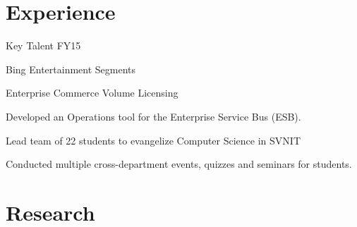 \documentclass[]{single-page-resume}
\begin{document}
\hfill
\begin{minipage}[t]{0.66\textwidth} 


\section{Experience}

\vspace{\topsep} %
\begin{tightemize}
    \item Key Talent FY15
    \item Bing Entertainment Segments
    \item Enterprise Commerce Volume Licensing
\end{tightemize}
\sectionsep

\begin{tightemize}
    \item Developed an Operations tool for the Enterprise Service Bus (ESB). \end{tightemize}
\sectionsep

\begin{tightemize}
    \item Lead team of 22 students to evangelize Computer Science in SVNIT
    \item Conducted multiple cross-department events, quizzes and seminars for students.  \end{tightemize}
\sectionsep

\sectionsep



\section{Research}
\descript{}
\sectionsep


\end{minipage}
\end{document}
